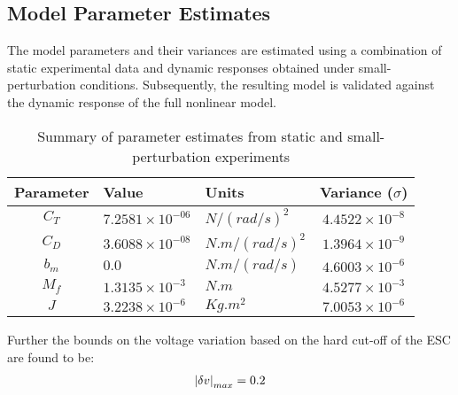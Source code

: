 \subsection{Model Parameter Estimates}
The model parameters and their variances are estimated using a combination of static experimental data and dynamic responses obtained under small-perturbation conditions. Subsequently, the resulting model is validated against the dynamic response of the full nonlinear model.
\begin{table}[h]
    \centering
    \begin{tabular}{c l l c}
        \hline \hline
        Parameter & Value & Units & Variance ($\sigma$)            \\ \hline \hline
        $C_T$ & $7.2581 \times 10^{-06}$ & $N/(rad/s)^2$   & $4.4522 \times 10^{-8}$ \\
        $C_D$ & $3.6088 \times 10^{-08}$ & $N.m/(rad/s)^2$ & $1.3964 \times 10^{-9}$ \\
        $b_m$ & $0.0$                    & $N.m/(rad/s)$   & $4.6003 \times 10^{-6}$  \\
        $M_f$ & $1.3135 \times 10^{-3}$  & $N.m$           & $4.5277 \times 10^{-3}$ \\
        $J$   & $3.2238 \times 10^{-6}$   & $Kg.m^2$        & $7.0053 \times 10^{-6}$ \\
        \hline \hline
    \end{tabular}
    \caption{Summary of parameter estimates from static and small-perturbation experiments}
    \label{tab::parm_ests}
\end{table}

Further the bounds on the voltage variation based on the hard cut-off of the ESC
are found to be:
\begin{align}
\left\lvert \delta v \right\rvert_{max} = 0.2
\end{align}
